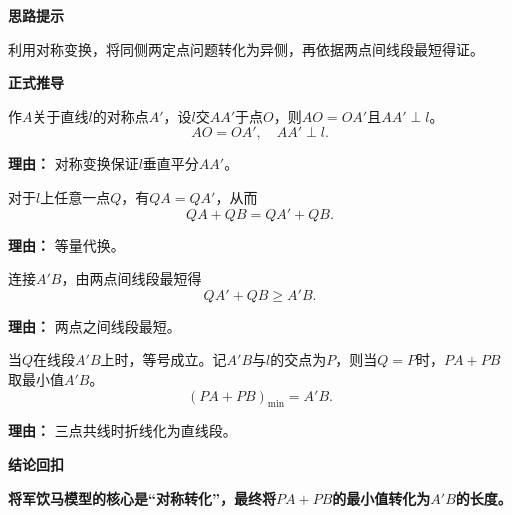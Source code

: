 \begin{proofbox}
	\textbf{\textcolor{CProof}{思路提示}}

	利用对称变换，将同侧两定点问题转化为异侧，再依据两点间线段最短得证。

	\medskip
	\textbf{\textcolor{CProof}{正式推导}}
	\begin{description}[style=nextline, leftmargin=2.8em, labelsep=0.5em, itemsep=0.55em]
		\item[\textbf{步骤一（作对称点）：}] 作$A$关于直线$l$的对称点$A'$，设$l$交$AA'$于点$O$，则$AO=OA'$且$AA'\perp l$。
			\[
				AO = OA',\quad AA'\perp l.
			\]
			\par\textbf{理由：} 对称变换保证$l$垂直平分$AA'$。

		\item[\textbf{步骤二（转化线段和）：}] 对于$l$上任意一点$Q$，有$QA=QA'$，从而
			\[
				QA+QB = QA'+QB.
			\]
			\par\textbf{理由：} 等量代换。

		\item[\textbf{步骤三（利用线段公理）：}] 连接$A'B$，由两点间线段最短得
			\[
				QA'+QB \ge A'B.
			\]
			\par\textbf{理由：} 两点之间线段最短。

		\item[\textbf{步骤四（取等条件）：}] 当$Q$在线段$A'B$上时，等号成立。记$A'B$与$l$的交点为$P$，则当$Q=P$时，$PA+PB$取最小值$A'B$。
			\[
				(PA+PB)_{\min}=A'B.
			\]
			\par\textbf{理由：} 三点共线时折线化为直线段。
	\end{description}

	\medskip
	\textbf{\textcolor{CProof}{结论回扣}}

	\textbf{将军饮马模型的核心是“对称转化”，最终将$PA+PB$的最小值转化为$A'B$的长度。}
\end{proofbox}
